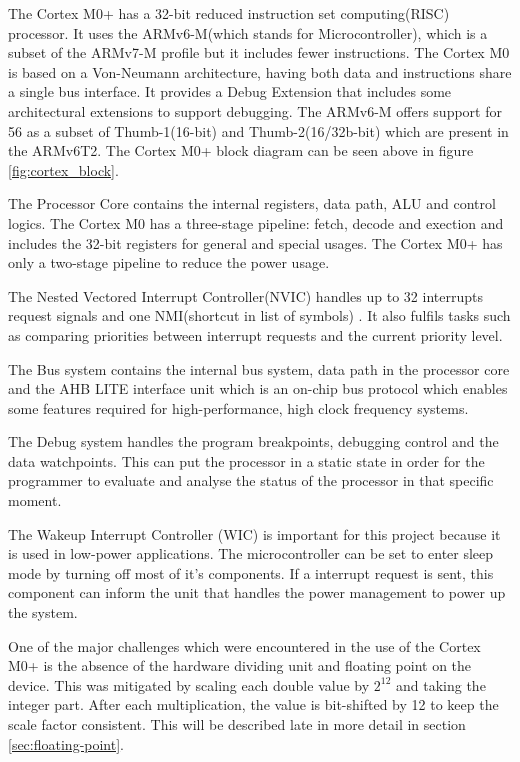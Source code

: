 The Cortex M0+ has a 32-bit reduced instruction set computing(RISC) processor. It uses the ARMv6-M(which stands for Microcontroller), which is a subset of the ARMv7-M profile but it includes fewer instructions. The Cortex M0 is based on a Von-Neumann architecture, having both data and instructions share a single bus interface. It provides a Debug Extension that includes some architectural extensions to support debugging. The ARMv6-M offers support for 56 as a subset of  Thumb-1(16-bit) and Thumb-2(16/32b-bit) which are present in the ARMv6T2. The Cortex M0+ block diagram can be seen above in figure \ref{fig:cortex_block}. 

The Processor Core contains the internal registers, data path, ALU and control logics. The Cortex M0 has a three-stage pipeline: fetch, decode and exection and includes the 32-bit registers for general and special usages. The Cortex M0+ has only a two-stage pipeline to reduce the power usage.

The Nested Vectored Interrupt Controller(NVIC) handles up to 32 interrupts request signals and one NMI(shortcut in list of symbols) . It also fulfils tasks such as comparing priorities between  interrupt requests and the current priority level. 

The Bus system contains the internal bus system, data path in the processor core and the AHB LITE interface unit which is an on-chip bus protocol which enables some features required for high-performance, high clock frequency systems. 

The Debug system handles the program breakpoints, debugging control and the data watchpoints. This can put the processor in a  static state in order for the programmer to evaluate and analyse the status of the processor in that specific moment.

The Wakeup Interrupt Controller (WIC) is important for this project because it is used in low-power applications. The microcontroller can be set to enter sleep mode by turning off most of it's components. If a interrupt request is sent, this component can inform the unit that handles the power management to power up the system.

One of the major challenges which were encountered in the use of the Cortex M0+ is the absence of the hardware dividing unit and floating point  on the device. This was mitigated by scaling each double value by $2^{12}$ and taking the integer part. After each multiplication, the value is bit-shifted by 12 to keep the scale factor consistent. This will be described late in more detail in section \ref{sec:floating-point}.

